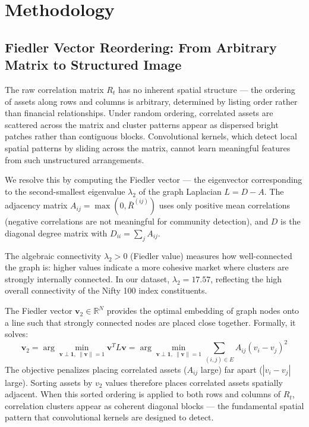 \documentclass[runningheads]{llncs}
\begin{document}
\section{Methodology}\label{sec:methodology}

\subsection{Fiedler Vector Reordering: From Arbitrary Matrix to Structured Image}

The raw correlation matrix $R_t$ has no inherent spatial structure ---
the ordering of assets along rows and columns is arbitrary, determined
by listing order rather than financial relationships. Under random
ordering, correlated assets are scattered across the matrix and cluster
patterns appear as dispersed bright patches rather than contiguous
blocks. Convolutional kernels, which detect local spatial patterns by
sliding across the matrix, cannot learn meaningful features from such
unstructured arrangements.

We resolve this by computing the Fiedler vector --- the eigenvector
corresponding to the second-smallest eigenvalue $\lambda_2$ of the
graph Laplacian $L = D - A$. The adjacency matrix $A_{ij} = \max(0,
\bar{R}^{(ij)})$ uses only positive mean correlations (negative
correlations are not meaningful for community detection), and $D$ is
the diagonal degree matrix with $D_{ii} = \sum_j A_{ij}$.

The algebraic connectivity $\lambda_2 > 0$ (Fiedler value) measures
how well-connected the graph is: higher values indicate a more
cohesive market where clusters are strongly internally connected.
In our dataset, $\lambda_2 = 17.57$, reflecting the high overall
connectivity of the Nifty 100 index constituents.

The Fiedler vector $\mathbf{v}_2 \in \mathbb{R}^N$ provides the
optimal embedding of graph nodes onto a line such that strongly
connected nodes are placed close together. Formally, it solves:
\begin{equation}
    \mathbf{v}_2 = \arg\min_{\mathbf{v} \perp \mathbf{1},\ \|\mathbf{v}\|=1}
    \mathbf{v}^T L \mathbf{v}
    = \arg\min_{\mathbf{v} \perp \mathbf{1},\ \|\mathbf{v}\|=1}
    \sum_{(i,j) \in E} A_{ij}(v_i - v_j)^2
\end{equation}
The objective penalizes placing correlated assets ($A_{ij}$ large)
far apart ($|v_i - v_j|$ large). Sorting assets by $v_2$ values
therefore places correlated assets spatially adjacent. When this
sorted ordering is applied to both rows and columns of $R_t$,
correlation clusters appear as coherent diagonal blocks --- the
fundamental spatial pattern that convolutional kernels are designed
to detect.
\end{document}

